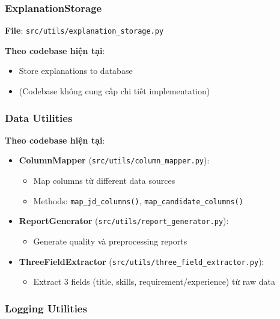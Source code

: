 \subsubsection{ExplanationStorage}

\textbf{File}: \texttt{src/utils/explanation\_storage.py}

\textbf{Theo codebase hiện tại}:
\begin{itemize}
    \item Store explanations to database
    \item (Codebase không cung cấp chi tiết implementation)
\end{itemize}

\subsubsection{Data Utilities}

\textbf{Theo codebase hiện tại}:

\begin{itemize}
    \item \textbf{ColumnMapper} (\texttt{src/utils/column\_mapper.py}):
    \begin{itemize}
        \item Map columns từ different data sources
        \item Methods: \texttt{map\_jd\_columns()}, \texttt{map\_candidate\_columns()}
    \end{itemize}
    
    \item \textbf{ReportGenerator} (\texttt{src/utils/report\_generator.py}):
    \begin{itemize}
        \item Generate quality và preprocessing reports
    \end{itemize}
    
    \item \textbf{ThreeFieldExtractor} (\texttt{src/utils/three\_field\_extractor.py}):
    \begin{itemize}
        \item Extract 3 fields (title, skills, requirement/experience) từ raw data
    \end{itemize}
\end{itemize}

\subsubsection{Logging Utilities}

